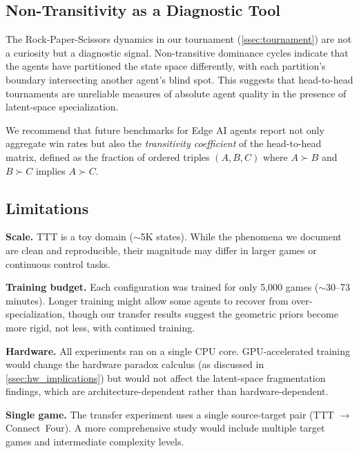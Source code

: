 \documentclass[conference]{IEEEtran}
\begin{document}
\subsection{Non-Transitivity as a Diagnostic Tool}
\label{ssec:nontrans_diagnostic}

The Rock-Paper-Scissors dynamics in our tournament (\cref{ssec:tournament}) are not a curiosity but a diagnostic signal. Non-transitive dominance cycles indicate that the agents have partitioned the state space differently, with each partition's boundary intersecting another agent's blind spot. This suggests that head-to-head tournaments are unreliable measures of absolute agent quality in the presence of latent-space specialization.

We recommend that future benchmarks for Edge AI agents report not only aggregate win rates but also the \emph{transitivity coefficient} of the head-to-head matrix, defined as the fraction of ordered triples $(A, B, C)$ where $A \succ B$ and $B \succ C$ implies $A \succ C$.


\subsection{Limitations}
\label{ssec:limitations}

\textbf{Scale.} TTT is a toy domain ($\sim$5K states). While the phenomena we document are clean and reproducible, their magnitude may differ in larger games or continuous control tasks.

\textbf{Training budget.} Each configuration was trained for only 5{,}000 games ($\sim$30--73 minutes). Longer training might allow some agents to recover from over-specialization, though our transfer results suggest the geometric priors become more rigid, not less, with continued training.

\textbf{Hardware.} All experiments ran on a single CPU core. GPU-accelerated training would change the hardware paradox calculus (as discussed in \cref{ssec:hw_implications}) but would not affect the latent-space fragmentation findings, which are architecture-dependent rather than hardware-dependent.

\textbf{Single game.} The transfer experiment uses a single source-target pair (TTT $\to$ Connect~Four). A more comprehensive study would include multiple target games and intermediate complexity levels.


\end{document}
